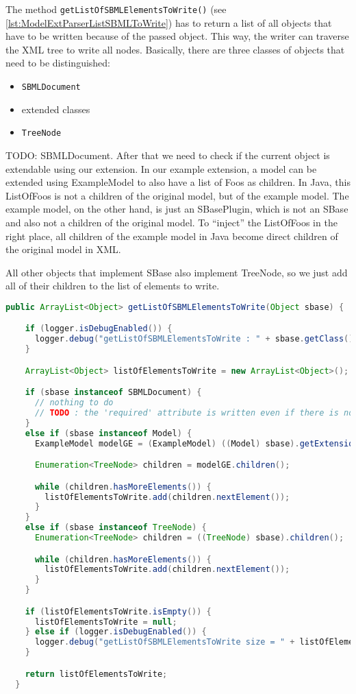 The method \texttt{getListOfSBMLElementsToWrite()} (see \ref{lst:ModelExtParserListSBMLToWrite}) has to return a list of all objects that have to be written because of the passed object.
This way, the writer can traverse the XML tree to write all nodes.
Basically, there are three classes of objects that need to be distinguished:
\begin{itemize}
 \item \texttt{SBMLDocument}
 \item extended classes
 \item \texttt{TreeNode}
\end{itemize}
TODO: SBMLDocument.
After that we need to check if the current object is extendable using our extension.
In our example extension, a model can be extended using ExampleModel to also have a list of Foos as children.
In Java, this ListOfFoos is not a children of the original model, but of the example model.
The example model, on the other hand, is just an SBasePlugin, which is not an SBase and also not a children of the original model.
To ``inject'' the ListOfFoos in the right place, all children of the example model in Java become direct children of the original model in XML.

All other objects that implement SBase also implement TreeNode, so we just add all of their children to the list of elements to write.

\begin{lstlisting}[language=Java,caption={Extension parser: \texttt{getListOfSBMLElementsToWrite()}},label={lst:ModelExtParserListSBMLToWrite}]
  public ArrayList<Object> getListOfSBMLElementsToWrite(Object sbase) {

    if (logger.isDebugEnabled()) {
      logger.debug("getListOfSBMLElementsToWrite : " + sbase.getClass().getCanonicalName());
    }

    ArrayList<Object> listOfElementsToWrite = new ArrayList<Object>();

    if (sbase instanceof SBMLDocument) {
      // nothing to do
      // TODO : the 'required' attribute is written even if there is no plugin class for the SBMLDocument, so I am not totally sure how this is done.
    }
    else if (sbase instanceof Model) {
      ExampleModel modelGE = (ExampleModel) ((Model) sbase).getExtension(ExampleConstant.namespaceURI);

      Enumeration<TreeNode> children = modelGE.children();

      while (children.hasMoreElements()) {
        listOfElementsToWrite.add(children.nextElement());
      }
    }
    else if (sbase instanceof TreeNode) {
      Enumeration<TreeNode> children = ((TreeNode) sbase).children();

      while (children.hasMoreElements()) {
        listOfElementsToWrite.add(children.nextElement());
      }
    }

    if (listOfElementsToWrite.isEmpty()) {
      listOfElementsToWrite = null;
    } else if (logger.isDebugEnabled()) {
      logger.debug("getListOfSBMLElementsToWrite size = " + listOfElementsToWrite.size());
    }

    return listOfElementsToWrite;
  }
\end{lstlisting}

